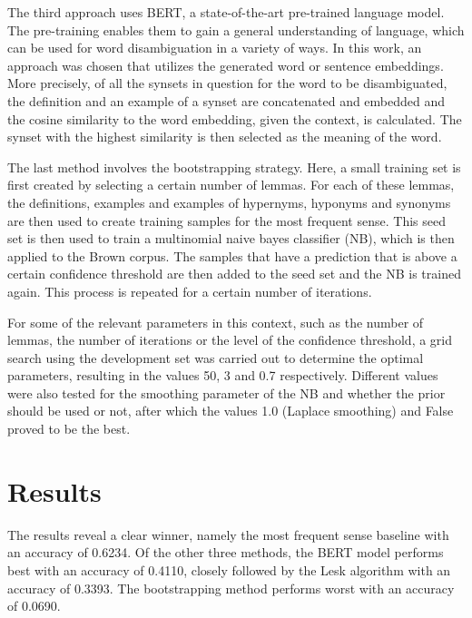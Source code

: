 \documentclass[12pt]{article}
\begin{document}
The third approach uses BERT, a state-of-the-art pre-trained language model. The pre-training enables them to gain a general understanding of language, which can be used for word disambiguation in a variety of ways. In this work, an approach was chosen that utilizes the generated word or sentence embeddings. More precisely, of all the synsets in question for the word to be disambiguated, the definition and an example of a synset are concatenated and embedded and the cosine similarity to the word embedding, given the context, is calculated. The synset with the highest similarity is then selected as the meaning of the word.

The last method involves the bootstrapping strategy. Here, a small training set is first created by selecting a certain number of lemmas. For each of these lemmas, the definitions, examples and examples of hypernyms, hyponyms and synonyms are then used to create training samples for the most frequent sense. This seed set is then used to train a multinomial naive bayes classifier (NB), which is then applied to the Brown corpus. The samples that have a prediction that is above a certain confidence threshold are then added to the seed set and the NB is trained again. This process is repeated for a certain number of iterations.

For some of the relevant parameters in this context, such as the number of lemmas, the number of iterations or the level of the confidence threshold, a grid search using the development set was carried out to determine the optimal parameters, resulting in the values 50, 3 and 0.7 respectively. Different values were also tested for the smoothing parameter of the NB and whether the prior should be used or not, after which the values 1.0 (Laplace smoothing) and False proved to be the best.

\section{Results}
The results reveal a clear winner, namely the most frequent sense baseline with an accuracy of 0.6234. Of the other three methods, the BERT model performs best with an accuracy of 0.4110, closely followed by the Lesk algorithm with an accuracy of 0.3393. The bootstrapping method performs worst with an accuracy of 0.0690.
\end{document}
